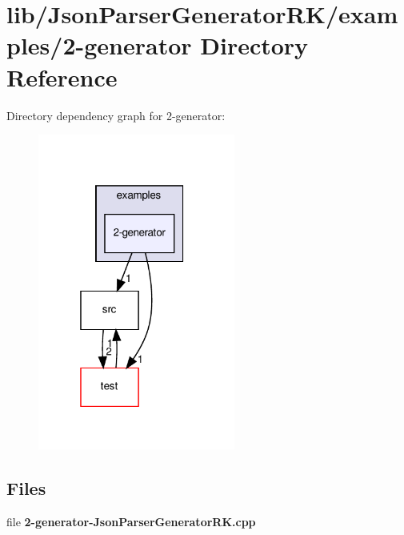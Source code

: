 \section{lib/\+Json\+Parser\+Generator\+R\+K/examples/2-\/generator Directory Reference}
\label{dir_0f6b282b501d65a4837da67a368c0dfa}
Directory dependency graph for 2-\/generator\+:\nopagebreak
\begin{figure}[H]
\begin{center}
\leavevmode
\includegraphics[width=184pt]{dir_0f6b282b501d65a4837da67a368c0dfa_dep}
\end{center}
\end{figure}
\subsection*{Files}
\begin{DoxyCompactItemize}
\item 
file \textbf{ 2-\/generator-\/\+Json\+Parser\+Generator\+R\+K.\+cpp}
\end{DoxyCompactItemize}

